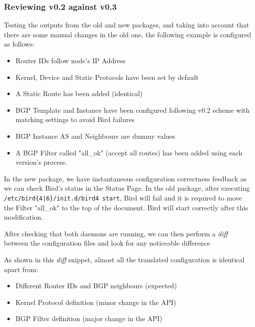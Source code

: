 \subsubsection{Reviewing v0.2 against v0.3}
Testing the outputs from the old and new packages, and taking into account that there are some manual changes in the old one, the following example is configured as follows:

\begin{itemize}
    \item Router IDs follow node's IP Address
    \item Kernel, Device and Static Protocols have been set by default
    \item A Static Route has been added  (identical)
    \item BGP Template and Instance have been configured following v0.2 scheme with matching settings to avoid Bird failures
    \item BGP Instance AS and Neighbours are dummy values
    \item A BGP Filter called "all\_ok" (accept all routes) has been added using each version's process.
\end{itemize}

In the new package, we have instantaneous configuration correctness feedback as we can check Bird's status in the Status Page. 
In the old package, after executing \texttt{/etc/bird\{4|6\}/init.d/bird4 start}, Bird will fail and it is required to move the Filter "all\_ok" to the top of the document. Bird will start correctly after this modification.

After checking that both daemons are running, we can then perform a \textit{diff} between the configuration files and look for any noticeable difference

%


As shown in this \textit{diff} snippet, almost all the translated configuration is identical apart from:

\begin{itemize}
\item Different Router IDs and BGP neighbours (expected)
\item Kernel Protocol definition (minor change in the API)
\item BGP Filter definition (major change in the API)
\end{itemize}


